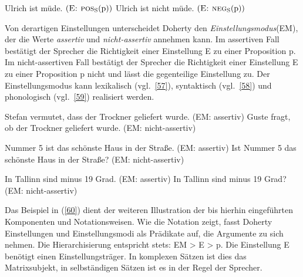 \begin{exe}
	\ex\label{56} 
		\begin{xlist}	
			\ex\label{56a} Ulrich ist müde. $(\textsc{E: pos}_{\textrm{S}}(\textrm{p}))$
			\ex\label{56b} Ulrich ist nicht müde. $(\textsc{E: neg}_{\textrm{S}}(\textrm{p}))$
		\end{xlist}
\end{exe}
Von derartigen Einstellungen unterscheidet Doherty den \textit{Einstellungsmodus}\linebreak (EM), der die Werte \textit{assertiv} und \textit{nicht-assertiv} annehmen kann. Im assertiven Fall bestätigt der Sprecher die Richtigkeit einer Einstellung E zu einer Proposition p. Im nicht-assertiven Fall bestätigt der Sprecher die Richtigkeit einer Einstellung E zu einer Proposition p nicht und lässt die gegenteilige Einstellung zu. Der Einstellungsmodus kann lexikalisch (vgl.\ \ref{57}), syntaktisch (vgl.\ \ref{58}) und phonologisch (vgl.\ \ref{59}) realisiert werden.

\begin{exe}
	\ex\label{57} 
		\begin{xlist}	
			\ex\label{57a} Stefan vermutet, dass der Trockner geliefert wurde. (EM: assertiv)
			\ex\label{57b} Guste fragt, ob der Trockner geliefert wurde. (EM: nicht-assertiv)
		\end{xlist}
\end{exe}

\begin{exe}
	\ex\label{58} 
		\begin{xlist}	
			\ex\label{58a} Nummer 5 ist das schönste Haus in der Straße. (EM: assertiv)
			\ex\label{58b} Ist Nummer 5 das schönste Haus in der Straße? (EM: nicht-assertiv)
		\end{xlist}
\end{exe}	 
			
\begin{exe}
	\ex\label{59} 
		\begin{xlist}	
			\ex\label{59a} In Tallinn sind minus 19 Grad. (EM: assertiv)
			\ex\label{59b} In Tallinn sind minus 19 Grad? (EM: nicht-assertiv)	
		\end{xlist}
\end{exe}
Das Beispiel in (\ref{60}) dient der weiteren Illustration der bis hierhin eingeführten Komponenten und Notationsweisen. Wie die Notation zeigt, fasst Doherty Einstellungen und Einstellungsmodi als Prädikate auf, die Argumente zu sich nehmen. Die Hierarchisierung entspricht stets: EM > E > p. Die Einstellung E benötigt einen Einstellungsträger. In komplexen Sätzen ist dies das Matrixsubjekt, in selbständigen Sätzen ist es in der Regel der Sprecher. 

